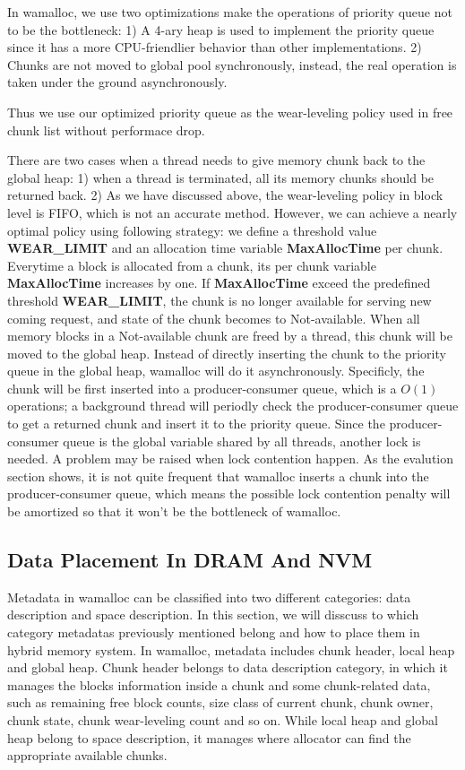 \documentclass{vldb}
\begin{document}
In wamalloc, we use two optimizations make the operations of priority queue not to be the bottleneck:
1) A 4-ary heap is used to implement the priority queue since it has a more CPU-friendlier behavior than other implementations.
2) Chunks are not moved to global pool synchronously, instead, the real operation is taken under the ground asynchronously.

Thus we use our optimized priority queue as the wear-leveling policy used in free chunk list without performace drop.

There are two cases when a thread needs to give memory chunk back to the global heap: 
1) when a thread is terminated, all its memory chunks should be returned back.
2) As we have discussed above, the wear-leveling policy in block level is FIFO, which is not an accurate method.
However, we can achieve a nearly optimal policy using following strategy: 
we define a threshold value \textbf{WEAR\_LIMIT} and an allocation time variable \textbf{MaxAllocTime} per chunk. 
Everytime a block is allocated from a chunk, its per chunk variable \textbf{MaxAllocTime} increases by one.
If \textbf{MaxAllocTime} exceed the predefined threshold \textbf{WEAR\_LIMIT}, 
the chunk is no longer available for serving new coming request, and state of the chunk becomes to Not-available.
When all memory blocks in a Not-available chunk are freed by a thread, this chunk will be moved to the global heap.
Instead of directly inserting the chunk to the priority queue in the global heap, wamalloc will do it asynchronously.
Specificly, the chunk will be first inserted into a producer-consumer queue, which is a $O(1)$ operations;
a background thread will periodly check the producer-consumer queue to get a returned chunk and insert it to the priority queue.
Since the producer-consumer queue is the global variable shared by all threads, another lock is needed.
A problem may be raised when lock contention happen.
As the evalution section shows, it is not quite frequent that wamalloc inserts a chunk into the producer-consumer queue,
which means the possible lock contention penalty will be amortized so that it won't be the bottleneck of wamalloc.

\subsection{Data Placement In DRAM And NVM}

Metadata in wamalloc can be classified into two different categories: data description and space description.
In this section, we will disscuss to which category metadatas previously mentioned belong and how to place them in hybrid memory system.
In wamalloc, metadata includes chunk header, local heap and global heap.
Chunk header belongs to data description category, in which it manages the blocks information inside a chunk and some chunk-related data, such as remaining free block counts, size class of current chunk, chunk owner, chunk state, chunk wear-leveling count and so on.
While local heap and global heap belong to space description, it manages where allocator can find the appropriate available chunks.
\end{document}
